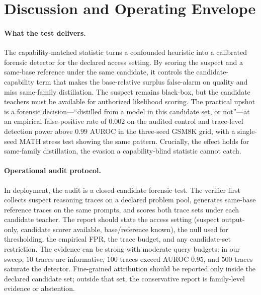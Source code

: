 \section{Discussion and Operating Envelope}
\label{sec:disc}

\paragraph{What the test delivers.}
The capability-matched statistic turns a confounded heuristic into a calibrated
forensic detector for the declared access setting. By scoring the suspect and a
same-base reference under the same candidate, it controls the candidate-capability
term that makes the base-relative surplus false-alarm on quality and miss
same-family distillation. The suspect remains black-box, but the candidate teachers
must be available for authorized likelihood scoring. The practical upshot is a
forensic decision---``distilled from a
model in this candidate set, or not''---at an empirical false-positive rate of
$0.002$ on the audited control and trace-level detection power above $0.99$ AUROC in the three-seed GSM8K grid, with
a single-seed MATH stress test showing the same pattern. Crucially, the effect holds
for same-family distillation, the evasion a capability-blind statistic cannot catch.

\paragraph{Operational audit protocol.}
In deployment, the audit is a closed-candidate forensic test. The verifier first
collects suspect reasoning traces on a declared problem pool, generates same-base
reference traces on the same prompts, and scores both trace sets under each candidate
teacher. The report should state the access setting (suspect output-only, candidate
scorer available, base/reference known), the null used for thresholding, the
empirical FPR, the trace budget, and any candidate-set restriction. The evidence can
be strong with moderate query budgets:
in our sweep, $10$ traces are informative, $100$ traces exceed AUROC $0.95$, and
$500$ traces saturate the detector. Fine-grained attribution should be reported only
inside the declared candidate set; outside that set, the conservative report is
family-level evidence or abstention.

